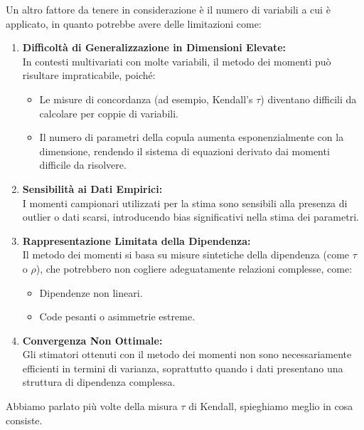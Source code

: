 \documentclass[a4paper,12pt]{article}
\begin{document}
\begin{itemize}
	Un altro fattore da tenere in considerazione è il numero di variabili a cui è applicato, in quanto potrebbe avere delle limitazioni come:\\
	\begin{enumerate}[label=\arabic*.]
		\item \textbf{Difficoltà di Generalizzazione in Dimensioni Elevate:} \\
		In contesti multivariati con molte variabili, il metodo dei momenti può risultare impraticabile, poiché:
		\begin{itemize}
			\item Le misure di concordanza (ad esempio, Kendall's \(\tau\)) diventano difficili da calcolare per coppie di variabili.
			\item Il numero di parametri della copula aumenta esponenzialmente con la dimensione, rendendo il sistema di equazioni derivato dai momenti difficile da risolvere.
		\end{itemize}
		
		\item \textbf{Sensibilità ai Dati Empirici:} \\
		I momenti campionari utilizzati per la stima sono sensibili alla presenza di outlier o dati scarsi, introducendo bias significativi nella stima dei parametri.
		
		\item \textbf{Rappresentazione Limitata della Dipendenza:} \\
		Il metodo dei momenti si basa su misure sintetiche della dipendenza (come \(\tau\) o \(\rho\)), che potrebbero non cogliere adeguatamente relazioni complesse, come:
		\begin{itemize}
			\item Dipendenze non lineari.
			\item Code pesanti o asimmetrie estreme.
		\end{itemize}
		
		\item \textbf{Convergenza Non Ottimale:} \\
		Gli stimatori ottenuti con il metodo dei momenti non sono necessariamente efficienti in termini di varianza, soprattutto quando i dati presentano una struttura di dipendenza complessa.
	\end{enumerate}
	\newpage
	
	Abbiamo parlato più volte della misura $\tau$ di Kendall, spieghiamo meglio in cosa consiste.\\
	

\end{itemize}
\end{document}
